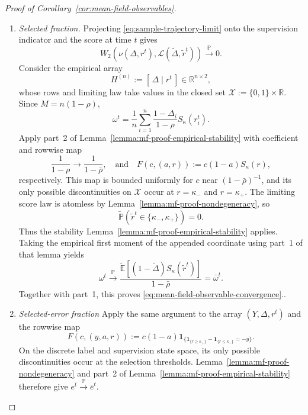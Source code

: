 \begin{proof}[Proof of Corollary~\ref{cor:mean-field-observables}]
\begin{enumerate}[wide]
    \item \emph{Selected fraction.}
    Projecting \eqref{eq:sample-trajectory-limit}
    onto the supervision indicator and the score at
    time $t$ gives
    \[
        W_2\left(
            \nu(\Delta,r^t),
            \mathscr L(\tilde\Delta,\tilde r^t)
        \right)
        \xrightarrow{\mathbb P}0.
    \]
    Consider the empirical array
    \[
        H^{(n)}:=[\,\Delta\mid r^t\,]
        \in\mathbb R^{n\times2},
    \]
    whose rows and limiting law take values in the
    closed set $\mathcal X:=\{0,1\}\times\mathbb R$.
    Since $M=n(1-\rho)$,
    \[
        \omega^t
        =
        \frac1n\sum_{i=1}^n
        \frac{1-\Delta_i}{1-\rho}S_\kappa(r_i^t).
    \]
    Apply part~2 of
    Lemma~\ref{lemma:mf-proof-empirical-stability}
    with coefficient and rowwise map
    \[
        \frac1{1-\rho}
        \longrightarrow
        \frac1{1-\bar\rho} , \quad \text{and} \quad  F(c,(a,r)):=c(1-a)S_\kappa(r),
    \]
    respectively.
    This map is bounded uniformly for $c$ near
    $(1-\bar\rho)^{-1}$, and its only possible
    discontinuities on $\mathcal X$ occur at
    $r=\kappa_-$ and $r=\kappa_+$.
    The limiting score law is atomless by
    Lemma~\ref{lemma:mf-proof-nondegeneracy}, so
    \[
        \tilde{\mathbb P}
        (\tilde r^t\in\{\kappa_-,\kappa_+\})=0.
    \]
    Thus the stability Lemma~\ref{lemma:mf-proof-empirical-stability} applies.
    Taking the empirical first moment of the appended
    coordinate using part~1 of that lemma yields
    \[
        \omega^t
        \xrightarrow{\mathbb P}
        \frac{
            \tilde{\mathbb E}
            [(1-\tilde\Delta)S_\kappa(\tilde r^t)]
        }{1-\bar\rho}
        =
        \bar\omega^t.
    \]
    Together with part~1, this proves
    \eqref{eq:mean-field-observable-convergence}..

    \item \emph{Selected-error fraction}
    Apply the same argument
    to the array $(Y,\Delta,r^t)$ and the rowwise map
    \[
        F(c,(y,a,r))
        :=
        c(1-a)
        \mathbf1_{\{
            \mathbf1_{\{r\geq\kappa_+\}}
            -\mathbf1_{\{r\leq\kappa_-\}}
            =-y
        \}}.
    \]
    On the discrete label and supervision state space, its only
    possible discontinuities occur at the selection thresholds.
    Lemma~\ref{lemma:mf-proof-nondegeneracy} and part~2 of
    Lemma~\ref{lemma:mf-proof-empirical-stability}
    therefore give $e^t\xrightarrow{\mathbb P}\bar e^t$.


\end{enumerate}
\end{proof}
